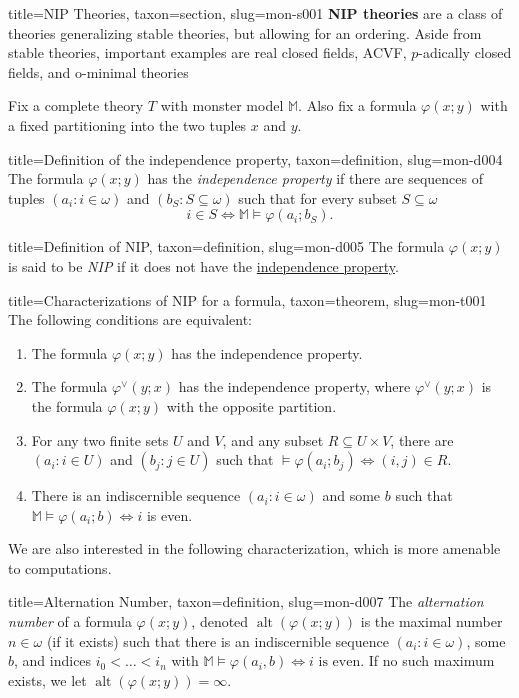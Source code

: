 \documentclass[a4paper]{article}
\begin{document}
\begin{tree}{title={NIP Theories}, taxon={section}, slug={mon-s001}}
\textbf{NIP theories} are a class of theories generalizing stable
theories, but allowing for an ordering. Aside from stable theories,
important examples are real closed fields, ACVF, \(p\)-adically closed
fields, and o-minimal theories\par{Fix a complete theory \(T\) with monster model \(\mathbb {M}\).
Also fix a formula \(\varphi (x;y)\) with a fixed partitioning into
the two tuples \(x\) and \(y\).}
\begin{tree}{title={Definition of the independence property}, taxon={definition}, slug={mon-d004}}
The formula \(\varphi (x;y)\) has the \emph{independence property} if there
are sequences of tuples \((a_i : i  \in   \omega )\) and
\((b_S : S  \subseteq   \omega )\) such that for every subset \(S  \subseteq   \omega\)
\[i  \in  S  \Longleftrightarrow   \mathbb {M}  \models   \varphi (a_i; b_S).\]
\end{tree}

\begin{tree}{title={Definition of NIP}, taxon={definition}, slug={mon-d005}}
The formula \(\varphi (x;y)\) is said to be \emph{NIP} if it does not have
the \href{mon-0004}{independence property}.
\end{tree}

\begin{tree}{title={Characterizations of NIP for a formula}, taxon={theorem}, slug={mon-t001}}
The following conditions are equivalent:
\begin{enumerate}
\item{ The formula \(\varphi (x;y)\) has the independence property.}
  \item{ The formula \(\varphi ^{ \vee }(y;x)\) has the independence property,
	where \(\varphi ^{ \vee }(y;x)\) is the formula \(\varphi (x;y)\) with the
	opposite partition.}
	\item{ For any two finite sets \(U\) and \(V\), and any subset \(R  \subseteq  U  \times  V\), there are \((a_i : i  \in  U)\) and \((b_j : j  \in  U)\) such that \(\mathbb   \models   \varphi (a_i;b_j)  \Longleftrightarrow  (i,j)  \in  R\).}
	\item{ There is an indiscernible sequence \((a_i : i  \in   \omega )\)
	and some \(b\) such that \(\mathbb  M  \models   \varphi (a_i;b)  \Longleftrightarrow  i\)
	is even.}
\end{enumerate}\par{We are also interested in the following characterization, which is more amenable to computations.}
\begin{tree}{title={Alternation Number}, taxon={definition}, slug={mon-d007}}
The \emph{alternation number} of a formula \(\varphi (x;y)\), denoted \(\operatorname {alt}( \varphi (x;y))\) is the maximal number \(n  \in   \omega\) (if it exists) such that there is an indiscernible sequence \((a_i : i  \in   \omega )\), some \(b\), and indices \(i_0 <  \dots  < i_n\) with \(\mathbb  M  \models   \varphi (a_i,b)  \Longleftrightarrow  i  \text { is even}\). If no such maximum exists, we let \(\operatorname {alt}( \varphi (x;y)) =  \infty\).
\end{tree}


\end{tree}
\end{tree}
\end{document}

